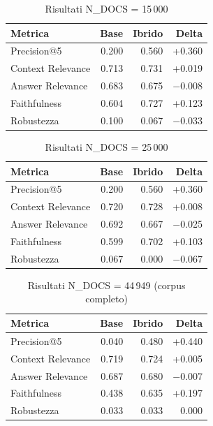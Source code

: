\documentclass[12pt,a4paper]{article}
\begin{document}
\begin{table}[H]
  \centering
  \caption{Risultati N\_DOCS = 15\,000}
  \begin{tabular}{lrrr}
    \toprule
    \textbf{Metrica} & \textbf{Base} & \textbf{Ibrido} & \textbf{Delta} \\
    \midrule
    Precision@5        & 0.200 & 0.560 & +0.360 \\
    Context Relevance  & 0.713 & 0.731 & +0.019 \\
    Answer Relevance   & 0.683 & 0.675 & $-$0.008 \\
    Faithfulness       & 0.604 & 0.727 & +0.123 \\
    Robustezza         & 0.100 & 0.067 & $-$0.033 \\
    \bottomrule
  \end{tabular}
\end{table}

\begin{table}[H]
  \centering
  \caption{Risultati N\_DOCS = 25\,000}
  \begin{tabular}{lrrr}
    \toprule
    \textbf{Metrica} & \textbf{Base} & \textbf{Ibrido} & \textbf{Delta} \\
    \midrule
    Precision@5        & 0.200 & 0.560 & +0.360 \\
    Context Relevance  & 0.720 & 0.728 & +0.008 \\
    Answer Relevance   & 0.692 & 0.667 & $-$0.025 \\
    Faithfulness       & 0.599 & 0.702 & +0.103 \\
    Robustezza         & 0.067 & 0.000 & $-$0.067 \\
    \bottomrule
  \end{tabular}
\end{table}

\begin{table}[H]
  \centering
  \caption{Risultati N\_DOCS = 44\,949 (corpus completo)}
  \begin{tabular}{lrrr}
    \toprule
    \textbf{Metrica} & \textbf{Base} & \textbf{Ibrido} & \textbf{Delta} \\
    \midrule
    Precision@5        & 0.040 & 0.480 & +0.440 \\
    Context Relevance  & 0.719 & 0.724 & +0.005 \\
    Answer Relevance   & 0.687 & 0.680 & $-$0.007 \\
    Faithfulness       & 0.438 & 0.635 & +0.197 \\
    Robustezza         & 0.033 & 0.033 & 0.000 \\
    \bottomrule
  \end{tabular}
\end{table}
\end{document}
